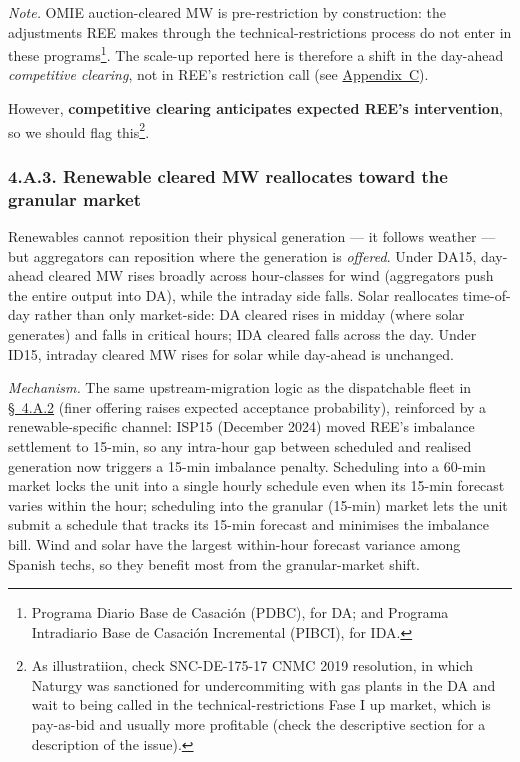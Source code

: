 \documentclass[11pt]{article}
\begin{document}
\emph{Note.} OMIE auction-cleared MW is pre-restriction by construction: the adjustments REE makes through the technical-restrictions process do not enter in these programs\footnote{Programa Diario Base de Casación (PDBC), for DA; and Programa Intradiario Base de Casación Incremental (PIBCI), for IDA.}. The scale-up reported here is therefore a shift in the day-ahead \emph{competitive clearing}, not in REE's restriction call (see \hyperref[sec:context]{Appendix~C}).

However, \textbf{competitive clearing anticipates expected REE's intervention}, so we should flag this\footnote{As illustratiion, check SNC-DE-175-17 CNMC 2019 resolution, in which Naturgy was sanctioned for undercommiting with gas plants in the DA and wait to being called in the technical-restrictions Fase I up market, which is pay-as-bid and usually more profitable (check the descriptive section for a description of the issue).}.

\subsubsection*{4.A.3. Renewable cleared MW reallocates toward the granular market}\label{sec:4-renewable}
Renewables cannot reposition their physical generation --- it follows weather --- but aggregators can reposition where the generation is \emph{offered}. Under DA15, day-ahead cleared MW rises broadly across hour-classes for wind (aggregators push the entire output into DA), while the intraday side falls. Solar reallocates time-of-day rather than only market-side: DA cleared rises in midday (where solar generates) and falls in critical hours; IDA cleared falls across the day. Under ID15, intraday cleared MW rises for solar while day-ahead is unchanged.

\emph{Mechanism.} The same upstream-migration logic as the dispatchable fleet in \hyperref[sec:4iii]{\S~4.A.2} (finer offering raises expected acceptance probability), reinforced by a renewable-specific channel: ISP15 (December 2024) moved REE's imbalance settlement to 15-min, so any intra-hour gap between scheduled and realised generation now triggers a 15-min imbalance penalty. Scheduling into a 60-min market locks the unit into a single hourly schedule even when its 15-min forecast varies within the hour; scheduling into the granular (15-min) market lets the unit submit a schedule that tracks its 15-min forecast and minimises the imbalance bill. Wind and solar have the largest within-hour forecast variance among Spanish techs, so they benefit most from the granular-market shift.
\end{document}
